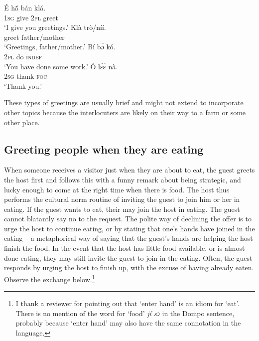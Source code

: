 \documentclass[output=paper,colorlinks,citecolor=brown]{langscibook}
\begin{document}
\ea \label{ex:farmgreeting}
\begin{xlist}
\ex 
    \gll É	hã́	bán	klá.\\
						\textsc{1sg}	give	\textsc{2pl}	greet\\
	\glt	‘I give you greetings.’
\ex
   \gll  Klà	trò/níí.\\
			greet	father/mother\\
		\glt ‘Greetings, father/mother.’
\ex
   \gll Bí	bɔ́	kó.\\
    			\textsc{2pl}	do	\textsc{indef}	\\
\glt			‘You have done some work.’
 \ex
   \gll Ó	lɛ̀ɛ́	nà.\\
   			\textsc{2sg}	thank	\textsc{foc}	\\
\glt			‘Thank you.’
\end{xlist}
\z

These types of greetings are usually brief and might not extend to incorporate other topics because the interlocuters are likely on their way to a farm or some other place.

\subsection{Greeting people when they are eating}

When someone receives a visitor just when they are about to eat, the guest greets the host first and follows this with a funny remark about being strategic, and lucky enough to come at the right time when there is food. The host thus performs the cultural norm routine of inviting the guest to join him or her in eating. If the guest wants to eat, their may join the host in eating. The guest cannot blatantly say no to the request. The polite way of declining the offer is to urge the host to continue eating, or by stating that one’s hands have joined in the eating -- a metaphorical way of saying that the guest's hands are helping the host finish the food. In the event that the host has little food available, or is almost done eating, they may still invite the guest to join in the eating. Often, the guest responds by urging the host to finish up, with the excuse of having already eaten. Observe the exchange below.\footnote{I thank a reviewer for pointing out that ‘enter hand’ is an idiom for ‘eat’. There is no mention of the word for `food' \textit{jí sɔ} in the Dompo sentence, probably because ‘enter hand’ may also have the same connotation in the language.}
\end{document}
